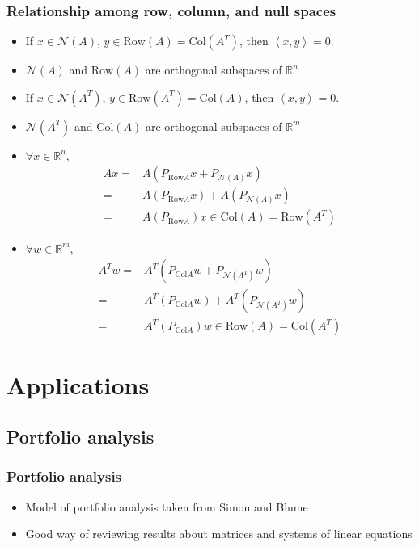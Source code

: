\documentclass[compress]{beamer}
\def\R{\mathbb{R}}
\newcommand{\iprod}[2]{\left\langle {#1} , {#2} \right\rangle}
\newcommand{\row}{\mathrm{Row}}
\newcommand{\col}{\mathrm{Col}}
\begin{document}
\begin{frame}[shrink]
  \frametitle{Relationship among row, column, and null
    spaces}
  \begin{itemize}
  \item If $x \in \mathcal{N}(A)$, $y \in \row(A) = \col(A^T)$, then
    $\iprod{x}{y} = 0$. 
  \item $\mathcal{N}(A)$ and $\row(A)$ are orthogonal subspaces of $\R^n$
  \item If $x \in \mathcal{N}(A^T)$, $y \in \row(A^T) = \col(A)$, then
    $\iprod{x}{y} = 0$. 
  \item $\mathcal{N}(A^T)$ and $\col(A)$ are orthogonal subspaces of
    $\R^m$
  \item $\forall x \in \R^n$, 
    \begin{align*}
      A x = & A (P_{\row{A}}x + P_{\mathcal{N}(A)} x)  \\
      = &  A (P_{\row{A}}x) + A (P_{\mathcal{N}(A)} x)  \\
      = & A (P_{\row{A}})x \in \col(A) = \row(A^T)
    \end{align*}
  \item $\forall w \in \R^m$,
    \begin{align*}
      A^T w = & A^T (P_{\col{A}}w + P_{\mathcal{N}(A^T)} w)  \\
      = &  A^T (P_{\col{A}}w) + A^T (P_{\mathcal{N}(A^T)} w) \\
      = & A^T (P_{\col{A}})w \in \row(A) = \col(A^T)
    \end{align*}    
  \end{itemize}
\end{frame}


\section{Applications}

\subsection{Portfolio analysis}

\begin{frame}
  \frametitle{Portfolio analysis}
  \begin{itemize}
  \item Model of portfolio analysis taken from Simon and Blume
  \item Good way of reviewing results about matrices and systems of
    linear equations 
  \end{itemize}
\end{frame}
\end{document}
